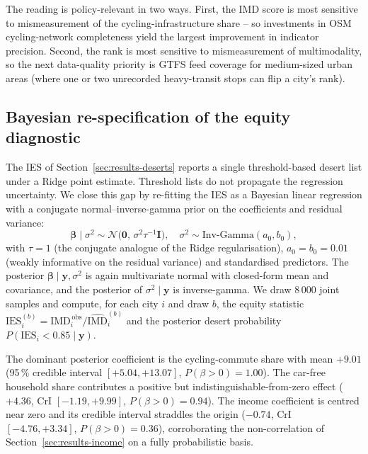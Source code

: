 \documentclass[11pt,a4paper]{article}
\newcommand{\IMD}{\mathrm{IMD}}
\newcommand{\IES}{\mathrm{IES}}
\begin{document}
The reading is policy-relevant in two ways. First, the IMD score
is most sensitive to mismeasurement of the cycling-infrastructure
share -- so investments in OSM cycling-network completeness yield
the largest improvement in indicator precision. Second, the rank
is most sensitive to mismeasurement of multimodality, so the next
data-quality priority is GTFS feed coverage for medium-sized urban
areas (where one or two unrecorded heavy-transit stops can flip a
city's rank).

\subsection{Bayesian re-specification of the equity diagnostic}
\label{sec:val-bayes-ies}

The IES of Section~\ref{sec:results-deserts} reports a single
threshold-based desert list under a Ridge point estimate.
Threshold lists do not propagate the regression uncertainty.
We close this gap by re-fitting the IES as a Bayesian linear
regression with a conjugate normal--inverse-gamma prior on the
coefficients and residual variance:
\begin{equation}
\boldsymbol{\beta} \mid \sigma^{2} \sim
    \mathcal{N}\!\bigl(\mathbf{0},\, \sigma^{2}\tau^{-1}\mathbf{I}\bigr),
\quad
\sigma^{2} \sim
    \mathrm{Inv\text{-}Gamma}(a_{0}, b_{0}),
\label{eq:bayesian-ies}
\end{equation}
with $\tau = 1$ (the conjugate analogue of the Ridge
regularisation), $a_{0} = b_{0} = 0.01$ (weakly informative on the
residual variance) and standardised predictors. The posterior
$\boldsymbol{\beta} \mid \mathbf{y}, \sigma^{2}$ is again
multivariate normal with closed-form mean and covariance, and the
posterior of $\sigma^{2} \mid \mathbf{y}$ is inverse-gamma. We
draw $8\,000$ joint samples and compute, for each city $i$ and
draw $b$, the equity statistic
$\IES_i^{(b)} = \IMD_i^{\,\text{obs}} / \widehat{\IMD}_i^{(b)}$ and
the posterior desert probability
$P(\IES_i < 0.85 \mid \mathbf{y})$.

The dominant posterior coefficient is the cycling-commute
share with mean $+9.01$ (95\,\% credible interval $[+5.04,
+13.07]$, $P(\beta > 0) = 1.00$). The car-free household share
contributes a positive but indistinguishable-from-zero effect
($+4.36$, CrI $[-1.19, +9.99]$, $P(\beta > 0) = 0.94$). The income
coefficient is centred near zero and its credible interval
straddles the origin ($-0.74$, CrI $[-4.76, +3.34]$,
$P(\beta > 0) = 0.36$), corroborating the non-correlation of
Section~\ref{sec:results-income} on a fully probabilistic basis.
\end{document}
